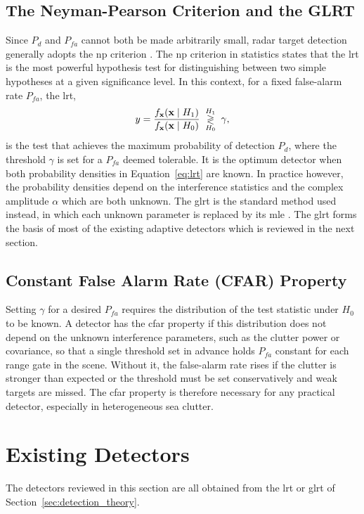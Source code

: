 \documentclass[12pt, a4paper]{report}
\begin{document}
\subsection{The Neyman-Pearson Criterion and the GLRT}
Since $P_d$ and $P_{fa}$ cannot both be made arbitrarily small, radar target detection generally adopts the \acrfull{np} criterion \cite{Neyman1933}. The \gls{np} criterion in statistics states that the \acrfull{lrt} is the most powerful hypothesis test for distinguishing between two simple hypotheses at a given significance level. In this context, for a fixed false-alarm rate $P_{fa}$, the \gls{lrt},
\begin{equation}
    y=\frac{f_{\vb x}(\vb x\mid H_1)}{f_{\vb x}(\vb x\mid H_0)}\;\underset{H_0}{\overset{H_1}{\gtrless}}\; \gamma,
    \label{eq:lrt}
\end{equation}
is the test that achieves the maximum probability of detection $P_d$, where the threshold $\gamma$ is set for a $P_{fa}$ deemed tolerable. It is the optimum detector when both probability densities in Equation~\eqref{eq:lrt} are known. In practice however, the probability densities depend on the interference statistics and the complex amplitude $\alpha$ which are both unknown. The \acrfull{glrt} is the standard method used instead, in which each unknown parameter is replaced by its \gls{mle} \cite{Kay1998}. The \gls{glrt} forms the basis of most of the existing adaptive detectors which is reviewed in the next section.\\

\subsection{Constant False Alarm Rate (CFAR) Property}
\label{sec:cfar}
Setting $\gamma$ for a desired $P_{fa}$ requires the distribution of the test statistic under $H_0$ to be known. A detector has the \gls{cfar} property if this distribution does not depend on the unknown interference parameters, such as the clutter power or covariance, so that a single threshold set in advance holds $P_{fa}$ constant for each range gate in the scene. Without it, the false-alarm rate rises if the clutter is stronger than expected or the threshold must be set conservatively and weak targets are missed. The \gls{cfar} property is therefore necessary for any practical detector, especially in heterogeneous sea clutter. 

\newpage
\section{Existing Detectors}
\label{sec:existing_detectors}
The detectors reviewed in this section are all obtained from the \gls{lrt} or \gls{glrt} of Section~\ref{sec:detection_theory}.
\end{document}
